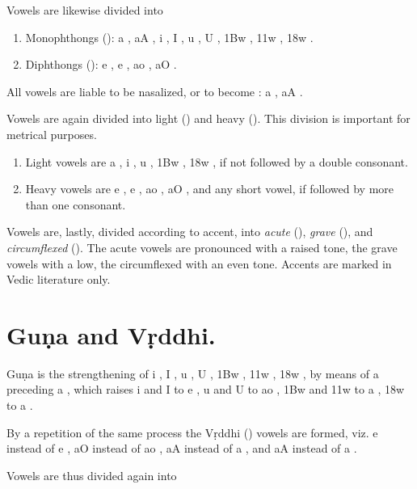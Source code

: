 \s Vowels are likewise divided into

\begin{enumerate}
\item Monophthongs (): {\dn a} , {\dn aA} , {\dn i}
  , {\dn I} , {\dn u} , {\dn U} , {\dn \31Bw} , {\dn \311w}
  , {\dn \318w} .
\item Diphthongs (): {\dn e} , {\dn e\?} , {\dn ao}
  , {\dn aO} .
\end{enumerate}

\s All vowels are liable to be nasalized, or to become :
{\dn a\1} , {\dn aA\1} .

\s Vowels are again divided into light () and heavy
(). This division is important for metrical purposes.

\begin{enumerate}
\item Light vowels are {\dn a} , {\dn i} , {\dn u} , {\dn \31Bw} ,
  {\dn \318w} , if not followed by a double consonant.
\item Heavy vowels are {\dn e} , {\dn e\?} , {\dn ao} , {\dn aO}
  , and any short vowel, if followed by more than one consonant.
\end{enumerate}

\s Vowels are, lastly, divided according to accent, into \emph{acute}
(), \emph{grave} (), and \emph{circumflexed}
(). The acute vowels are pronounced with a raised tone, the
grave vowels with a low, the circumflexed with an even tone. Accents are
marked in Vedic literature only.

\section{Guṇa and Vṛddhi.}

\s Guṇa is the strengthening of {\dn i} , {\dn I} , {\dn u} ,
{\dn U} , {\dn \31Bw} , {\dn \311w} , {\dn \318w} , by means of
a preceding {\dn a} , which raises {\dn i}  and {\dn I}  to {\dn e}
, {\dn u}  and {\dn U}  to {\dn ao} , {\dn \31Bw}  and {\dn \311w}
 to {\dn a} , {\dn \318w}  to {\dn a} .

By a repetition of the same process the Vṛddhi () vowels
are formed, viz. {\dn e\?}  instead of {\dn e} , {\dn aO} 
instead of {\dn ao} , {\dn aA}  instead of {\dn a} , and
{\dn aA}  instead of {\dn a} .

Vowels are thus divided again into

